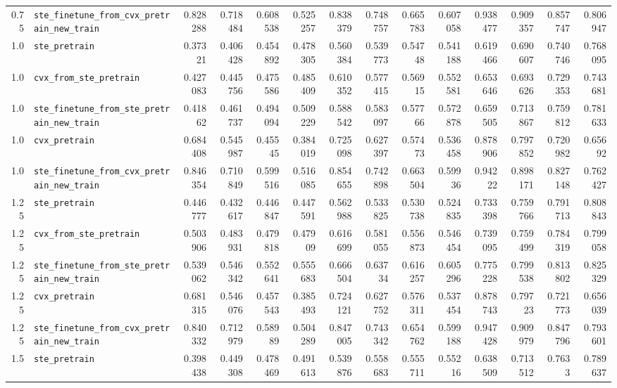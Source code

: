 \begin{longtable}{@{}r l *{12}{r}@{}}
0.75 & \texttt{ste\_finetune\_from\_cvx\_pretrain\_new\_train} & 0.828288 & 0.718484 & 0.608538 & 0.525257 & 0.838379 & 0.748757 & 0.665783 & 0.607058 & 0.938477 & 0.909357 & 0.857747 & 0.806947 \\
1.0 & \texttt{ste\_pretrain} & 0.37321 & 0.406428 & 0.454892 & 0.478305 & 0.560384 & 0.539773 & 0.54748 & 0.541188 & 0.619466 & 0.690607 & 0.740746 & 0.768095 \\
1.0 & \texttt{cvx\_from\_ste\_pretrain} & 0.427083 & 0.445756 & 0.475586 & 0.485409 & 0.610352 & 0.577415 & 0.56915 & 0.552581 & 0.653646 & 0.693626 & 0.729353 & 0.743681 \\
1.0 & \texttt{ste\_finetune\_from\_ste\_pretrain\_new\_train} & 0.41862 & 0.461737 & 0.494094 & 0.509229 & 0.588542 & 0.583097 & 0.57766 & 0.572878 & 0.659505 & 0.713867 & 0.759812 & 0.781633 \\
1.0 & \texttt{cvx\_pretrain} & 0.684408 & 0.545987 & 0.45545 & 0.384019 & 0.725098 & 0.627397 & 0.57473 & 0.536458 & 0.878906 & 0.797852 & 0.720982 & 0.65692 \\
1.0 & \texttt{ste\_finetune\_from\_cvx\_pretrain\_new\_train} & 0.846354 & 0.710849 & 0.599516 & 0.516085 & 0.854655 & 0.742898 & 0.663504 & 0.59936 & 0.94222 & 0.898171 & 0.827148 & 0.762427 \\
1.25 & \texttt{ste\_pretrain} & 0.446777 & 0.432617 & 0.446847 & 0.447591 & 0.562988 & 0.533825 & 0.530738 & 0.524835 & 0.733398 & 0.759766 & 0.791713 & 0.808843 \\
1.25 & \texttt{cvx\_from\_ste\_pretrain} & 0.503906 & 0.483931 & 0.479818 & 0.47909 & 0.616699 & 0.581055 & 0.556873 & 0.546454 & 0.739095 & 0.759499 & 0.784319 & 0.799058 \\
1.25 & \texttt{ste\_finetune\_from\_ste\_pretrain\_new\_train} & 0.539062 & 0.546342 & 0.552641 & 0.555683 & 0.666504 & 0.63734 & 0.616257 & 0.605296 & 0.775228 & 0.799538 & 0.813802 & 0.825329 \\
1.25 & \texttt{cvx\_pretrain} & 0.681315 & 0.546076 & 0.457543 & 0.385493 & 0.724121 & 0.627752 & 0.576311 & 0.537454 & 0.878743 & 0.79723 & 0.721773 & 0.656039 \\
1.25 & \texttt{ste\_finetune\_from\_cvx\_pretrain\_new\_train} & 0.840332 & 0.712979 & 0.58989 & 0.504289 & 0.847005 & 0.743342 & 0.654762 & 0.599188 & 0.947428 & 0.909979 & 0.847796 & 0.793601 \\
1.5 & \texttt{ste\_pretrain} & 0.398438 & 0.449308 & 0.478469 & 0.491613 & 0.539876 & 0.558683 & 0.555711 & 0.55216 & 0.638509 & 0.713512 & 0.7633 & 0.789637 \\

\end{longtable}
